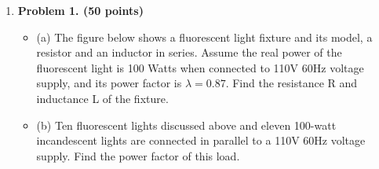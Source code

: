 \begin{enumerate}

\item {\bf Problem 1. (50 points)} 

\begin{itemize}
\item (a) The figure below shows a fluorescent light fixture and 
  its model, a resistor and an inductor in series. Assume the real power
  of the fluorescent light is 100 Watts when connected to 110V 60Hz voltage
  supply, and its power factor is $\lambda=0.87$. Find the resistance 
  R and inductance L of the fixture.

\item (b) Ten fluorescent lights discussed above and eleven
  100-watt incandescent lights are connected in parallel to a 110V 60Hz
  voltage supply. Find the power factor of this load.
\end{itemize}






\end{enumerate}
